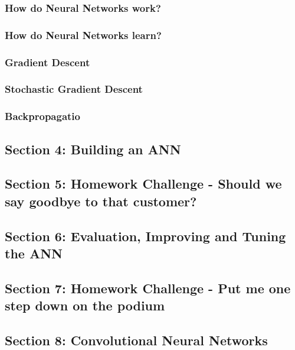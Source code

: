 \documentclass[11pt]{article}
\begin{document}
\subsubsection{How do Neural Networks work?}
\label{sec:org0008b30}

\subsubsection{How do Neural Networks learn?}
\label{sec:org16c0e85}

\subsubsection{Gradient Descent}
\label{sec:orgd99563a}

\subsubsection{Stochastic Gradient Descent}
\label{sec:org20a6cc1}


\subsubsection{Backpropagatio}
\label{sec:orgf86a913}


\subsection{Section 4: Building an ANN}
\label{sec:org9fcaab0}

\subsection{Section 5: Homework Challenge - Should we say goodbye to that customer?}
\label{sec:org8fed90b}

\subsection{Section 6: Evaluation, Improving and Tuning the ANN}
\label{sec:orge5b54ba}

\subsection{Section 7: Homework Challenge - Put me one step down on the podium}
\label{sec:org53aad63}

\subsection{Section 8: Convolutional Neural Networks}
\label{sec:orge98fbeb}
\end{document}
